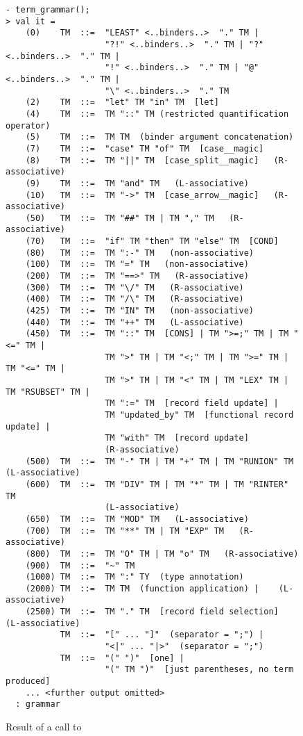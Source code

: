 \setcounter{sessioncount}{0}
\begin{figure}[htbp]
\begin{session}
\begin{verbatim}
- term_grammar();
> val it =
    (0)    TM  ::=  "LEAST" <..binders..>  "." TM |
                    "?!" <..binders..>  "." TM | "?" <..binders..>  "." TM |
                    "!" <..binders..>  "." TM | "@" <..binders..>  "." TM |
                    "\" <..binders..>  "." TM
    (2)    TM  ::=  "let" TM "in" TM  [let]
    (4)    TM  ::=  TM "::" TM (restricted quantification operator)
    (5)    TM  ::=  TM TM  (binder argument concatenation)
    (7)    TM  ::=  "case" TM "of" TM  [case__magic]
    (8)    TM  ::=  TM "||" TM  [case_split__magic]   (R-associative)
    (9)    TM  ::=  TM "and" TM   (L-associative)
    (10)   TM  ::=  TM "->" TM  [case_arrow__magic]   (R-associative)
    (50)   TM  ::=  TM "##" TM | TM "," TM   (R-associative)
    (70)   TM  ::=  "if" TM "then" TM "else" TM  [COND]
    (80)   TM  ::=  TM ":-" TM   (non-associative)
    (100)  TM  ::=  TM "=" TM   (non-associative)
    (200)  TM  ::=  TM "==>" TM   (R-associative)
    (300)  TM  ::=  TM "\/" TM   (R-associative)
    (400)  TM  ::=  TM "/\" TM   (R-associative)
    (425)  TM  ::=  TM "IN" TM   (non-associative)
    (440)  TM  ::=  TM "++" TM   (L-associative)
    (450)  TM  ::=  TM "::" TM  [CONS] | TM ">=;" TM | TM "<=" TM |
                    TM ">" TM | TM "<;" TM | TM ">=" TM | TM "<=" TM |
                    TM ">" TM | TM "<" TM | TM "LEX" TM | TM "RSUBSET" TM |
                    TM ":=" TM  [record field update] |
                    TM "updated_by" TM  [functional record update] |
                    TM "with" TM  [record update]
                    (R-associative)
    (500)  TM  ::=  TM "-" TM | TM "+" TM | TM "RUNION" TM   (L-associative)
    (600)  TM  ::=  TM "DIV" TM | TM "*" TM | TM "RINTER" TM
                    (L-associative)
    (650)  TM  ::=  TM "MOD" TM   (L-associative)
    (700)  TM  ::=  TM "**" TM | TM "EXP" TM   (R-associative)
    (800)  TM  ::=  TM "O" TM | TM "o" TM   (R-associative)
    (900)  TM  ::=  "~" TM
    (1000) TM  ::=  TM ":" TY  (type annotation)
    (2000) TM  ::=  TM TM  (function application) |    (L-associative)
    (2500) TM  ::=  TM "." TM  [record field selection]   (L-associative)
           TM  ::=  "[" ... "]"  (separator = ";") |
                    "<|" ... "|>"  (separator = ";")
           TM  ::=  "(" ")"  [one] |
                    "(" TM ")"  [just parentheses, no term produced]
    ... <further output omitted>
  : grammar
\end{verbatim}
\end{session}
\caption{Result of a call to }
\label{fig:term-grammar}
\end{figure}

